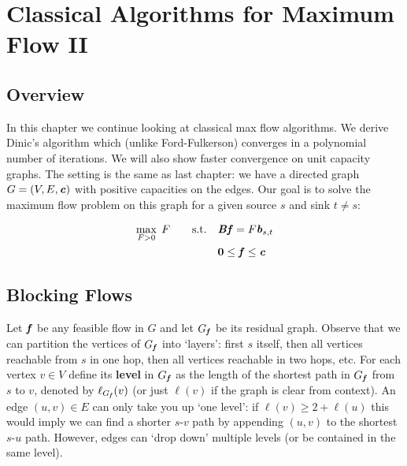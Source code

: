 %
%


\chapter{Classical
  Algorithms for Maximum Flow II}

%

\sloppy

\section{Overview}
In this chapter we continue looking at classical max flow algorithms. We derive Dinic's algorithm which
(unlike Ford-Fulkerson) converges in a polynomial number of iterations. We will also show faster
convergence on unit capacity graphs.
The setting is the same as last chapter: we have a directed graph $G = (V, E, \boldsymbol{\mathit{c}})$ with
positive capacities
on the edges. Our goal is to solve the maximum flow problem on this graph for a given source $s$ and sink
$t \neq s$:

\begin{align}
  \begin{aligned}
    \max_{F>0} \;F\qquad\text{s.t.}\quad&\boldsymbol{\mathit{B}}\boldsymbol{\mathit{f}} = F\boldsymbol{\mathit{b}}_{s,t} \\
    &\boldsymbol{0}\leq \boldsymbol{\mathit{f}}\leq \boldsymbol{\mathit{c}}
  \end{aligned}
\end{align}

\section{Blocking Flows}
Let $\boldsymbol{\mathit{f}}$ be any feasible flow in $G$ and let $G_{\boldsymbol{\mathit{f}}}$ be its residual graph.
Observe that we can partition the
vertices of $G_{\boldsymbol{\mathit{f}}}$ into `layers': first $s$ itself, then all vertices reachable from $s$ in one hop, then all
vertices reachable in two hops, etc. For each vertex $v\in V$ define its \textbf{level} in $G_{\boldsymbol{\mathit{f}}}$ as the
length of the shortest path in $G_{\boldsymbol{\mathit{f}}}$ from $s$ to $v$, denoted by $\ell_{G_{\boldsymbol{\mathit{f}}}}(v)$ (or just $\ell(v)$ if the
graph is clear from context). An edge $(u, v) \in E$ can only take you up `one level': if
$\ell(v) \geq 2+\ell(u)$ this would imply we can find a shorter $s$-$v$ path by appending $(u, v)$ to the
shortest $s$-$u$ path. However, edges can `drop down' multiple levels (or be contained in the same level).

